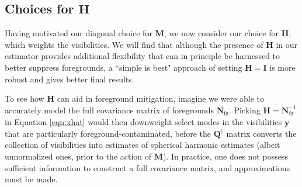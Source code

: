 \documentclass[twocolumn,apj,numberedappendix]{emulateapj}
\newcommand{\y}{\mathbf{y}}
\newcommand{\Hmat}{\mathbf{H}}
\newcommand{\Nfg}{\mathbf{N}_{\textrm{fg}}}
\newcommand{\Q}{\mathbf{Q}}
\newcommand{\M}{\mathbf{M}}
\begin{document}
\subsection{Choices for $\Hmat$}
\label{sec:Hchoices}
Having motivated our diagonal choice for $\M$, we now consider our choice for $\Hmat$, which weights the visibilities. We will find that although the presence of $\Hmat$ in our estimator provides additional flexibility that can in principle be harnessed to better suppress foregrounds, a ``simple is best" approach of setting $\Hmat = \mathbf{I}$ is more robust and gives better final results.

To see how $\Hmat$ can aid in foreground mitigation, imagine we were able to accurately model the full covariance matrix of foregrounds $\mathbf{N}_\textrm{fg}$. Picking $\Hmat = \Nfg^{-1}$ in Equation \eqref{eqn:xhat} would then downweight select modes in the visibilities $\y$ that are particularly foreground-contaminated, before the $\Q^\dagger$ matrix converts the collection of visibilities into estimates of spherical harmonic estimates (albeit unnormalized ones, prior to the action of $\M$). In practice, one does not possess sufficient information to construct a full covariance matrix, and approximations must be made.
\end{document}
